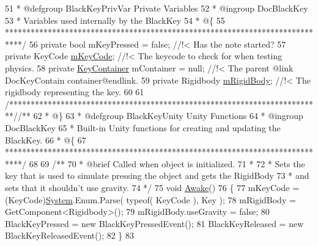 \begin{DoxyCodeInclude}
51 \textcolor{comment}{     * @defgroup BlackKeyPrivVar Private Variables}
52 \textcolor{comment}{     * @ingroup DocBlackKey}
53 \textcolor{comment}{     * Variables used internally by the BlackKey}
54 \textcolor{comment}{     * @\{}
55 \textcolor{comment}{     ****************************************************************************/}
56     \textcolor{keyword}{private} \textcolor{keywordtype}{bool} mKeyPressed = \textcolor{keyword}{false}; \textcolor{comment}{//!< Has the note started?}
57 \textcolor{comment}{}    \textcolor{keyword}{private} KeyCode \hyperlink{group___black_key_priv_var_ga2272fa345880793dcd89f7ca942f6685}{mKeyCode}; \textcolor{comment}{//!< The keycode to check for when testing physics.}
58 \textcolor{comment}{}    \textcolor{keyword}{private} \hyperlink{class_key_container}{KeyContainer} mContainer = null; \textcolor{comment}{//!< The parent @link DocKeyContain
       container@endlink.}
59 \textcolor{comment}{}    \textcolor{keyword}{private} Rigidbody \hyperlink{group___black_key_priv_var_ga5185c6ea66892bcbe9e83eb615f39566}{mRigidBody}; \textcolor{comment}{//!< The rigidbody representing the key.}
60 \textcolor{comment}{}
61     \textcolor{comment}{/*************************************************************************/}\textcolor{comment}{/** }
62 \textcolor{comment}{     * @\}}
63 \textcolor{comment}{     * @defgroup BlackKeyUnity Unity Functions}
64 \textcolor{comment}{     * @ingroup DocBlackKey}
65 \textcolor{comment}{     * Built-in Unity functions for creating and updating the BlackKey.}
66 \textcolor{comment}{     * @\{}
67 \textcolor{comment}{     ****************************************************************************/}
68 \textcolor{comment}{}
69 \textcolor{comment}{    /**}
70 \textcolor{comment}{     * @brief Called when object is initialized.}
71 \textcolor{comment}{     * }
72 \textcolor{comment}{     * Sets the key that is used to simulate pressing the object and gets the RigidBody}
73 \textcolor{comment}{     * and sets that it shouldn't use gravity.}
74 \textcolor{comment}{     */}
75     \textcolor{keywordtype}{void} \hyperlink{group___black_key_unity_ga6e05fcdf362e52d9a71b4f25ad840b5b}{Awake}()
76     \{
77         mKeyCode = (KeyCode)\hyperlink{namespace_system}{System}.Enum.Parse( typeof( KeyCode ), Key );
78         mRigidBody = GetComponent<Rigidbody>();
79         mRigidBody.useGravity = \textcolor{keyword}{false};
80         BlackKeyPressed = \textcolor{keyword}{new} BlackKeyPressedEvent();
81         BlackKeyReleased = \textcolor{keyword}{new} BlackKeyReleasedEvent();
82     \}
83 \textcolor{comment}{}

\end{DoxyCodeInclude}
